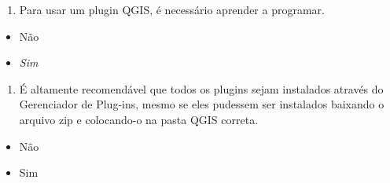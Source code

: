 \documentclass[
  portuguese,
]{krantz}
\providecommand{\tightlist}{%
  \setlength{\itemsep}{0pt}\setlength{\parskip}{0pt}}
\begin{document}
\begin{enumerate}
\def\labelenumi{\arabic{enumi}.}
\setcounter{enumi}{1}
\tightlist
\item
  Para usar um plugin QGIS, é necessário aprender a programar.
\end{enumerate}

\begin{itemize}
\tightlist
\item
  { Não }
\item
  \emph{Sim}
\end{itemize}

\begin{enumerate}
\def\labelenumi{\arabic{enumi}.}
\setcounter{enumi}{2}
\tightlist
\item
  É altamente recomendável que todos os plugins sejam instalados através do Gerenciador de Plug-ins, mesmo se eles pudessem ser instalados baixando o arquivo zip e colocando-o na pasta QGIS correta.
\end{enumerate}

\begin{itemize}
\tightlist
\item
  Não
\item
  { Sim }
\end{itemize}
\end{document}
